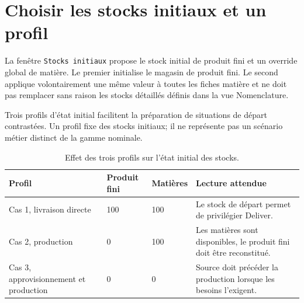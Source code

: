 
\section{Choisir les stocks initiaux et un profil}

La fenêtre \texttt{Stocks initiaux} propose le stock initial de produit fini et un override global de matière. Le premier initialise le magasin de produit fini. Le second applique volontairement une même valeur à toutes les fiches matière et ne doit pas remplacer sans raison les stocks détaillés définis dans la vue Nomenclature.


Trois profils d'état initial facilitent la préparation de situations de départ contrastées. Un profil fixe des stocks initiaux; il ne représente pas un scénario métier distinct de la gamme nominale.

\begin{table}[H]
  \centering
  \begin{tabularx}{\textwidth}{L{0.30\textwidth} L{0.20\textwidth} L{0.20\textwidth} Y}
    \toprule
    Profil & Produit fini & Matières & Lecture attendue \\
    \midrule
    Cas 1, livraison directe & 100 & 100 & Le stock de départ permet de privilégier Deliver. \\
    Cas 2, production & 0 & 100 & Les matières sont disponibles, le produit fini doit être reconstitué. \\
    Cas 3, approvisionnement et production & 0 & 0 & Source doit précéder la production lorsque les besoins l'exigent. \\
    \bottomrule
  \end{tabularx}
  \caption{Effet des trois profils sur l'état initial des stocks.}
  \label{tab:profils-stocks}
\end{table}


